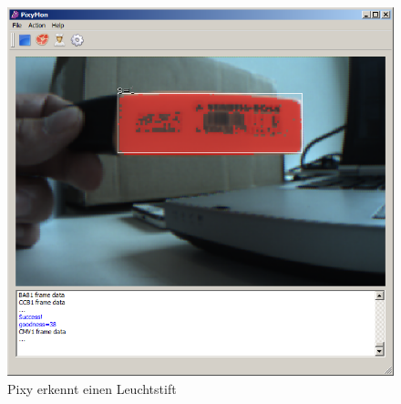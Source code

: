 \begin{figure}[h!]
\centering
\includegraphics[width=0.7\linewidth]{../../fig/pixy_objekt}
\caption{Pixy erkennt einen Leuchtstift}
\label{fig:pixy_objekt}
\end{figure}